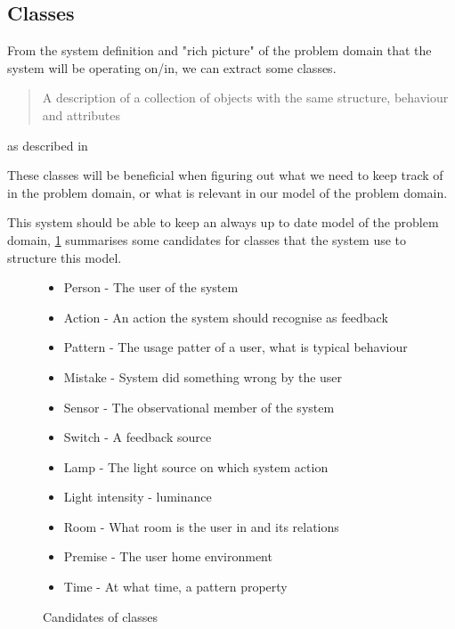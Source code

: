 \subsection{Classes}

From the system definition and "rich picture" of the problem domain that the system will be operating on/in, we can extract some classes. 

\begin{quote}
A description of a collection of objects with the same structure, behaviour and attributes
\end{quote}
as described in \cite{OOAD}

These classes will be beneficial when figuring out what we need to keep track of in the problem domain, or what is relevant in our model of the problem domain.

This system should be able to keep an always up to date model of the problem domain, \cref{lis:classes} summarises some candidates for classes that the system use to structure this model.

\begin{figure}
  \label{lis:classes}
  \begin{itemize}
    \item Person - The user of the system
    \item Action - An action the system should recognise as feedback
    \item Pattern - The usage patter of a user, what is typical behaviour
    \item Mistake - System did something wrong by the user
    \item Sensor - The observational member of the system
    \item Switch - A feedback source
    \item Lamp - The light source on which system action
    \item Light intensity - luminance
    \item Room - What room is the user in and its relations
    \item Premise - The user home environment
    \item Time - At what time, a pattern property
  \end{itemize}
  \caption{Candidates of classes}
\end{figure}
